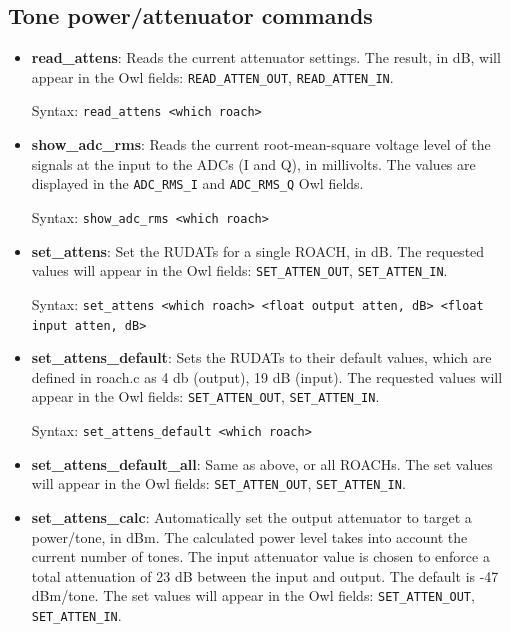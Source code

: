 \subsection{Tone power/attenuator commands}
\begin{itemize}[leftmargin=*,label={}]

\item \textbf{read\_attens}: Reads the current attenuator settings. The result, in dB, will appear in the Owl fields: \texttt{READ\_ATTEN\_OUT}, \texttt{READ\_ATTEN\_IN}.

Syntax: \texttt{read\_attens <which roach>}

\item \textbf{show\_adc\_rms}: Reads the current root-mean-square voltage level of the signals at the input to the ADCs (I and Q), in millivolts. The values are displayed in the \texttt{ADC\_RMS\_I} and \texttt{ADC\_RMS\_Q} Owl fields.

Syntax: \texttt{show\_adc\_rms <which roach>}

\item \textbf{set\_attens}: Set the RUDATs for a single ROACH, in dB. The requested values will appear in the Owl fields: \texttt{SET\_ATTEN\_OUT}, \texttt{SET\_ATTEN\_IN}.

Syntax: \texttt{set\_attens <which roach> <float output atten, dB> <float input atten, dB>}

\item \textbf{set\_attens\_default}: Sets the RUDATs to their default values, which are defined in roach.c as 4 db (output), 19 dB (input). The requested values will appear in the Owl fields: \texttt{SET\_ATTEN\_OUT}, \texttt{SET\_ATTEN\_IN}.

Syntax: \texttt{set\_attens\_default <which roach>}

\item \textbf{set\_attens\_default\_all}: Same as above, or all ROACHs. The set values will appear in the Owl fields: \texttt{SET\_ATTEN\_OUT}, \texttt{SET\_ATTEN\_IN}.

\item \textbf{set\_attens\_calc}: Automatically set the output attenuator to target a power/tone, in dBm. The calculated power level takes into account the current number of tones. The input attenuator value is chosen to enforce a total attenuation of 23 dB between the input and output. The default is -47 dBm/tone. The set values will appear in the Owl fields: \texttt{SET\_ATTEN\_OUT}, \texttt{SET\_ATTEN\_IN}.


\end{itemize}
